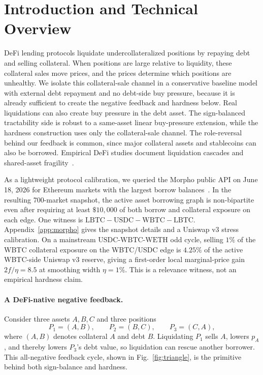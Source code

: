 \documentclass{llncs}
\begin{document}
\section{Introduction and Technical Overview}
\label{sec:intro}
DeFi lending protocols liquidate undercollateralized positions by repaying debt and selling collateral. When positions are large relative to liquidity, these collateral sales move prices, and the prices determine which positions are unhealthy. We isolate this collateral-sale channel in a conservative baseline model with external debt repayment and no debt-side buy pressure, because it is already sufficient to create the negative feedback and hardness below. Real liquidations can also create buy pressure in the debt asset. The sign-balanced tractability side is robust to a same-asset linear buy-pressure extension, while the hardness construction uses only the collateral-sale channel. The role-reversal behind our feedback is common, since major collateral assets and stablecoins can also be borrowed. Empirical DeFi studies document liquidation cascades and shared-asset fragility~\cite{Perez2021,Qin2021,LeharParlour2022,TianZhu2025,BartolettiLipparini2025}.

As a lightweight protocol calibration, we queried the Morpho public API on June 18, 2026 for Ethereum markets with the largest borrow balances~\cite{MorphoDocs}. In the resulting 700-market snapshot, the active asset borrowing graph is non-bipartite even after requiring at least \(\$10{,}000\) of both borrow and collateral exposure on each edge. One witness is \(\mathrm{LBTC}-\mathrm{USDC}-\mathrm{WBTC}-\mathrm{LBTC}\). Appendix~\ref{app:morpho} gives the snapshot details and a Uniswap v3 stress calibration. On a mainstream \(\mathrm{USDC}\)-\(\mathrm{WBTC}\)-\(\mathrm{WETH}\) odd cycle, selling \(1\%\) of the WBTC collateral exposure on the WBTC/USDC edge is \(4.25\%\) of the active WBTC-side Uniswap v3 reserve, giving a first-order local marginal-price gain \(2f/\eta=8.5\) at smoothing width \(\eta=1\%\). This is a relevance witness, not an empirical hardness claim.

\paragraph{A DeFi-native negative feedback.}
Consider three assets \(A,B,C\) and three positions
\[
P_1=(A,B),\qquad P_2=(B,C),\qquad P_3=(C,A),
\]
where \((A,B)\) denotes collateral \(A\) and debt \(B\). Liquidating \(P_1\) sells \(A\), lowers \(p_A\), and thereby lowers \(P_3\)'s debt value, so liquidation can rescue another borrower. This all-negative feedback cycle, shown in Fig.~\ref{fig:triangle}, is the primitive behind both sign-balance and hardness.
\end{document}
